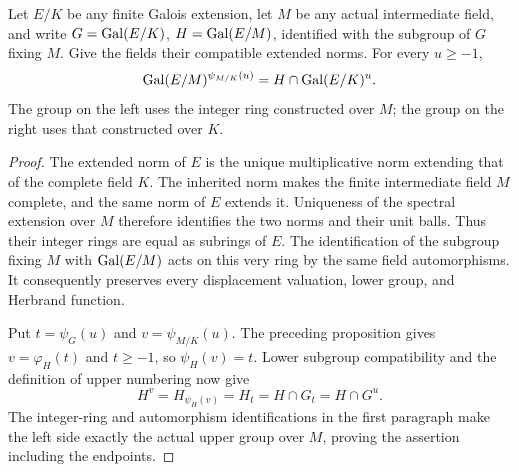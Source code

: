 \begin{proposition}
\label{fw:finite-base-upper}
\leanok
Let $E/K$ be any finite Galois extension, let $M$ be any
actual intermediate field, and write $G=\operatorname{Gal}(E/K)$, $H=\operatorname{Gal}(E/M)$, identified
with the subgroup of $G$ fixing $M$. Give the fields their compatible
extended norms. For every $u\geq-1$,
\[
 \operatorname{Gal}(E/M)^{\psi_{M/K}(u)}=H\cap\operatorname{Gal}(E/K)^u.
\]
The group on the left uses the integer ring constructed over $M$;
the group on the right uses that constructed over $K$.
\end{proposition}
\begin{proof}
The extended norm of $E$ is the unique multiplicative norm extending
that of the complete field $K$. The inherited norm makes the finite
intermediate field $M$ complete, and the same norm of $E$ extends it.
Uniqueness of the spectral extension over $M$ therefore identifies the
two norms and their unit balls. Thus their integer rings are equal as
subrings of $E$. The identification of the subgroup fixing $M$ with
$\operatorname{Gal}(E/M)$ acts on this very ring by the same field automorphisms.
It consequently preserves every displacement valuation, lower group,
and Herbrand function.

Put $t=\psi_G(u)$ and $v=\psi_{M/K}(u)$. The preceding proposition gives
$v=\varphi_H(t)$ and $t\geq-1$, so $\psi_H(v)=t$. Lower subgroup
compatibility and the definition of upper numbering now give
\[
 H^v=H_{\psi_H(v)}=H_t=H\cap G_t=H\cap G^u.
\]
The integer-ring and automorphism identifications in the first paragraph
make the left side exactly the actual upper group over $M$, proving
the assertion including the endpoints.
\end{proof}

